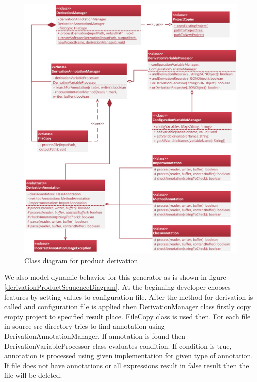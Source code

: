 \documentclass[11pt,english,a4paper,twoside]{article}
\begin{document}
\begin{figure}[H]  %
					\begin{center}
									\includegraphics[width=\linewidth]{fig/DerivationClassTight.png}
									\caption{Class diagram for product derivation}
									\label{derivationProductClassDiagram}
					\end{center}
\end{figure}


We also model dynamic behavior for this generator as is shown in figure \ref{derivationProductSequenceDiagram}. At the beginning developer chooses features by setting values to configuration file. After the method for derivation is called and configuration file is applied then DerivationManager class firstly copy empty project to specified result place. FileCopy class is used then. For each file in source src directory tries to find annotation using DerivationAnnotationManager. If annotation is found then DerivationVariableProcessor class evaluates condition. If condition is true, annotation is processed using given implementation for given type of annotation. If file does not have annotations or all expressions result in false result then the file will be deleted.
\end{document}
